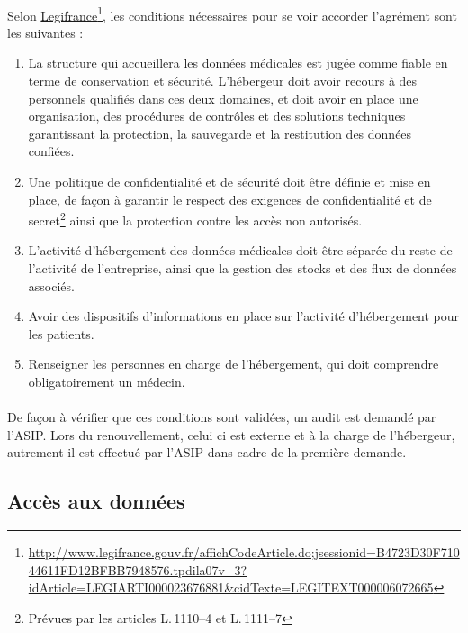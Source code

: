 \paragraph{}
Selon
\href{http://www.legifrance.gouv.fr/affichCodeArticle.do;jsessionid=B4723D30F71044611FD12BFBB7948576.tpdila07v_3?idArticle=LEGIARTI000023676881&cidTexte=LEGITEXT000006072665}{Legifrance}\footnote{\url{http://www.legifrance.gouv.fr/affichCodeArticle.do;jsessionid=B4723D30F71044611FD12BFBB7948576.tpdila07v_3?idArticle=LEGIARTI000023676881&cidTexte=LEGITEXT000006072665}},
les conditions nécessaires pour se voir accorder
l'agrément sont les suivantes :
\begin{enumerate}
    \item La structure qui accueillera les données médicales est jugée comme
        fiable en terme de conservation et sécurité. L'hébergeur doit avoir
        recours à des personnels qualifiés dans ces deux domaines, et doit
        avoir en place une organisation, des procédures de contrôles et des
        solutions techniques garantissant la protection, la sauvegarde et la
        restitution des données confiées.
    \item Une politique de confidentialité et de sécurité doit être définie et
        mise en place, de façon à garantir le respect des exigences de
        confidentialité et de secret\footnote{Prévues par les articles
        L.\,1110--4 et L.\,1111--7} ainsi que la protection contre les accès
        non autorisés.
    \item L'activité d'hébergement des données médicales doit être séparée du
        reste de l'activité de l'entreprise, ainsi que la gestion des stocks et
        des flux de données associés.
    \item Avoir des dispositifs d'informations en place sur l'activité
        d'hébergement pour les patients.
    \item Renseigner les personnes en charge de l'hébergement, qui doit
        comprendre obligatoirement un médecin.
\end{enumerate}

\paragraph{}
De façon à vérifier que ces conditions sont validées, un audit est demandé par
l'ASIP\@. Lors du renouvellement, celui ci est externe et à la charge de
l'hébergeur, autrement il est effectué par l'ASIP dans cadre de la première
demande.

        \subsection{Accès aux données}
